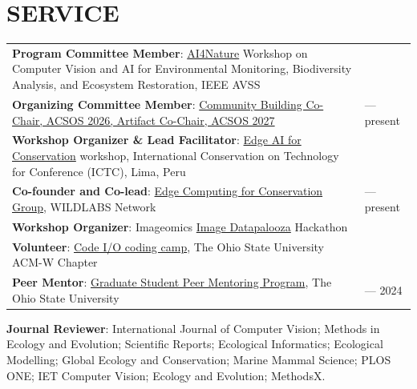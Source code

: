 \section{SERVICE}
\renewcommand{\arraystretch}{1.3}
{\small
\setlength{\LTpre}{0pt}\setlength{\LTpost}{0pt}
\begin{longtable}{@{}p{\dimexpr\linewidth-8.5em\relax}@{\hspace{1em}}>{\raggedleft\arraybackslash}p{7.5em}@{}}
\textbf{Program Committee Member}: \href{https://www.ai4nature.tech/}{AI4Nature} Workshop on Computer Vision and AI for Environmental Monitoring, Biodiversity Analysis, and Ecosystem Restoration, IEEE AVSS & 2026 \\
\textbf{Organizing Committee Member}: \href{https://2026.acsos.org/committee/acsos-2026-organizing-committee}{Community Building Co-Chair, ACSOS 2026, Artifact Co-Chair, ACSOS 2027} & 2026 --- present \\
\textbf{Workshop Organizer \& Lead Facilitator}: \href{https://jennamk14.github.io/edgeAI-ICTC-2025/index.html}{Edge AI for Conservation} workshop, International Conservation on Technology for Conference (ICTC), Lima, Peru & 2026 \\
\textbf{Co-founder and Co-lead}: \href{https://wildlabs.net/groups/edge-computing}{Edge Computing for Conservation Group}, WILDLABS Network & 2025 --- present \\
\textbf{Workshop Organizer}: Imageomics \href{https://imageomics.osu.edu/news/2023/08/image-datapalooza-recap}{Image Datapalooza} Hackathon & 2023 \\
\textbf{Volunteer}: \href{https://acmwosu.github.io/codeio.html}{Code I/O coding camp}, The Ohio State University ACM-W Chapter & 2023 \\
\textbf{Peer Mentor}: \href{https://engineering.osu.edu/graduate/peer-mentors}{Graduate Student Peer Mentoring Program}, The Ohio State University & 2022 --- 2024 \\
\end{longtable}
\par\vspace{2pt}\noindent
\textbf{Journal Reviewer}: International Journal of Computer Vision; Methods in Ecology and Evolution; Scientific Reports; Ecological Informatics; Ecological Modelling; Global Ecology and Conservation; Marine Mammal Science; PLOS ONE; IET Computer Vision; Ecology and Evolution; MethodsX.
\\
}
